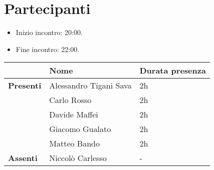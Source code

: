 \section{Partecipanti}

\begin{itemize}
	\item Inizio incontro: 20:00.
	\item Fine incontro: 22:00.
\end{itemize}


\begin{center}
	{\renewcommand{\arraystretch}{1.5}
		\begin{tabular}{lll}
			                  & \textbf{Nome}          & \textbf{Durata presenza} \\
			\hline
			\textbf{Presenti} & Alessandro Tigani Sava & 2h                       \\
			                  & Carlo Rosso            & 2h                       \\
			                  & Davide Maffei          & 2h                       \\
			                  & Giacomo Gualato        & 2h                       \\
			                  & Matteo Bando           & 2h                       \\
			\hline
			\textbf{Assenti}  & Niccolò Carlesso       & -                       \\
		\end{tabular}
	}
\end{center}
